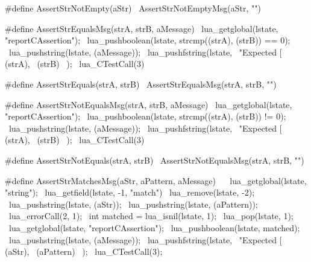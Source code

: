 #define AssertStrNotEmpty(aStr) \
  AssertStrNotEmptyMsg(aStr, "")
\stopCHeader

\stopTestSuite

\startTestSuite[assertStrEquals]

\startCHeader
#define AssertStrEqualsMsg(strA, strB, aMessage)        \
  lua_getglobal(lstate, "reportCAssertion");            \
  lua_pushboolean(lstate, strcmp((strA), (strB)) == 0); \
  lua_pushstring(lstate, (aMessage));                   \
  lua_pushfstring(lstate,                               \
      "Expected [%
      (strA),                                           \
      (strB)                                            \
    );                                                  \
  lua_CTestCall(3)

#define AssertStrEquals(strA, strB) \
  AssertStrEqualsMsg(strA, strB, "")
\stopCHeader

\stopTestSuite

\startTestSuite[assertStrNotEquals]

\startCHeader
#define AssertStrNotEqualsMsg(strA, strB, aMessage)     \
  lua_getglobal(lstate, "reportCAssertion");            \
  lua_pushboolean(lstate, strcmp((strA), (strB)) != 0); \
  lua_pushstring(lstate, (aMessage));                   \
  lua_pushfstring(lstate,                               \
      "Expected [%
      (strA),                                           \
      (strB)                                            \
    );                                                  \
  lua_CTestCall(3)

#define AssertStrNotEquals(strA, strB) \
  AssertStrNotEqualsMsg(strA, strB, "")
\stopCHeader

\stopTestSuite

\startTestSuite[assertStrMatches]

\startCHeader
#define AssertStrMatchesMsg(aStr, aPattern, aMessage) \
{                                                     \
  lua_getglobal(lstate, "string");                    \
  lua_getfield(lstate, -1, "match")                   \
  lua_remove(lstate, -2);                             \
  lua_pushstring(lstate, (aStr));                     \
  lua_pushstring(lstate, (aPattern));                 \
  lua_errorCall(2, 1);                                \
  int matched = lua_isnil(lstate, 1);                 \
  lua_pop(lstate, 1);                                 \
  lua_getglobal(lstate, "reportCAssertion");          \
  lua_pushboolean(lstate, matched);                   \
  lua_pushstring(lstate, (aMessage));                 \
  lua_pushfstring(lstate,                             \
      "Expected [%
      (aStr),                                         \
      (aPattern)                                      \
    );                                                \
  lua_CTestCall(3);                                   \
}

